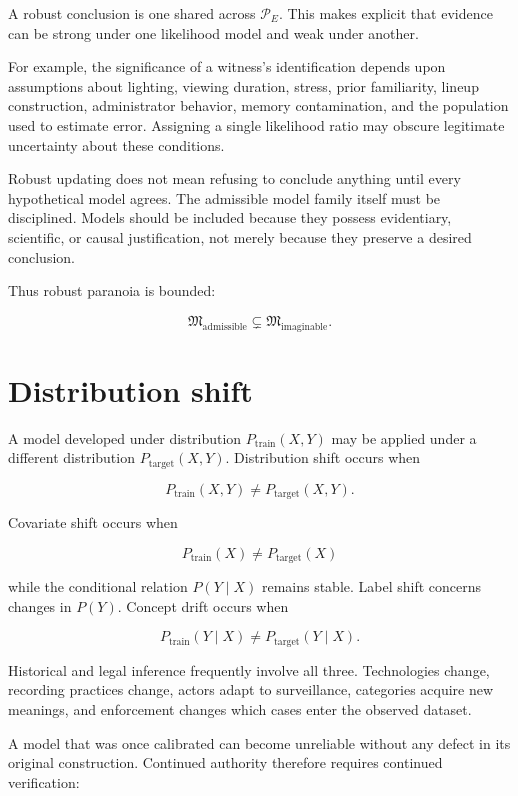 A robust conclusion is one shared across \(\mathcal P_E\). This makes explicit that evidence can be strong under one likelihood model and weak under another.

For example, the significance of a witness's identification depends upon assumptions about lighting, viewing duration, stress, prior familiarity, lineup construction, administrator behavior, memory contamination, and the population used to estimate error. Assigning a single likelihood ratio may obscure legitimate uncertainty about these conditions.

Robust updating does not mean refusing to conclude anything until every hypothetical model agrees. The admissible model family itself must be disciplined. Models should be included because they possess evidentiary, scientific, or causal justification, not merely because they preserve a desired conclusion.

Thus robust paranoia is bounded:

\[
\mathfrak M_{\mathrm{admissible}}
\subsetneq
\mathfrak M_{\mathrm{imaginable}}.
\]

\section{Distribution shift}
\label{sec:a25}

A model developed under distribution \(P_{\mathrm{train}}(X,Y)\) may be applied under a different distribution \(P_{\mathrm{target}}(X,Y)\). Distribution shift occurs when

\[
P_{\mathrm{train}}(X,Y)
\neq
P_{\mathrm{target}}(X,Y).
\]

Covariate shift occurs when

\[
P_{\mathrm{train}}(X)
\neq
P_{\mathrm{target}}(X)
\]

while the conditional relation \(P(Y\mid X)\) remains stable. Label shift concerns changes in \(P(Y)\). Concept drift occurs when

\[
P_{\mathrm{train}}(Y\mid X)
\neq
P_{\mathrm{target}}(Y\mid X).
\]

Historical and legal inference frequently involve all three. Technologies change, recording practices change, actors adapt to surveillance, categories acquire new meanings, and enforcement changes which cases enter the observed dataset.

A model that was once calibrated can become unreliable without any defect in its original construction. Continued authority therefore requires continued verification:

